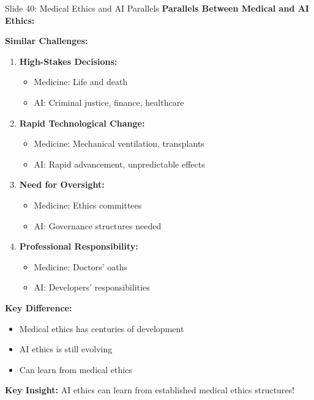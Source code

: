 \documentclass[8pt]{beamer}
\begin{document}
	\begin{frame}{Slide 40: Medical Ethics and AI Parallels}
		\fontsize{6.5}{7.5}\selectfont
		\textbf{Parallels Between Medical and AI Ethics:}
		
		\vspace{0.1cm}
		\textbf{Similar Challenges:}
		\begin{enumerate}
			\item \textbf{High-Stakes Decisions:}
			\begin{itemize}
				\item Medicine: Life and death
				\item AI: Criminal justice, finance, healthcare
			\end{itemize}
			\item \textbf{Rapid Technological Change:}
			\begin{itemize}
				\item Medicine: Mechanical ventilation, transplants
				\item AI: Rapid advancement, unpredictable effects
			\end{itemize}
			\item \textbf{Need for Oversight:}
			\begin{itemize}
				\item Medicine: Ethics committees
				\item AI: Governance structures needed
			\end{itemize}
			\item \textbf{Professional Responsibility:}
			\begin{itemize}
				\item Medicine: Doctors' oaths
				\item AI: Developers' responsibilities
			\end{itemize}
		\end{enumerate}
		
		\vspace{0.1cm}
		\textbf{Key Difference:}
		\begin{itemize}
			\item Medical ethics has centuries of development
			\item AI ethics is still evolving
			\item Can learn from medical ethics
		\end{itemize}
		
		\textcolor{myblue}{\textbf{Key Insight:}} AI ethics can \textcolor{myblue}{learn from established medical ethics} structures!
	\end{frame}
	
\end{document}
